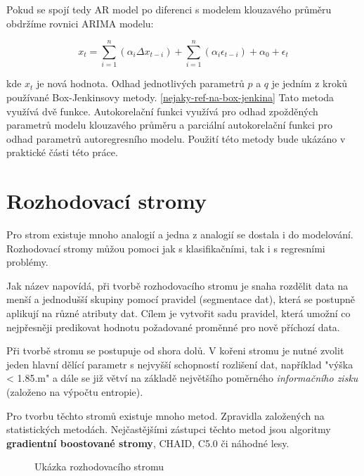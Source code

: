 \documentclass[FM,BP,fonts]{tulthesis}
\begin{document}
Pokud se spojí tedy AR model po diferenci s modelem klouzavého průměru obdržíme rovnici ARIMA modelu: 

\begin{equation}
 x_t =    \sum_{i=1}^{n}(\alpha_i \Delta x_{t-i}) + \sum_{i=1}^{n}(\alpha_i\epsilon_{t-i}) + \alpha_0 + \epsilon_t
\end{equation}

kde $x_t$ je nová hodnota. Odhad jednotlivých parametrů $p$ a $q$ je jedním z kroků používané Box-Jenkinsovy metody. \ref{nejaky-ref-na-box-jenkina} Tato metoda využívá dvě funkce. Autokorelační funkci využívá pro odhad zpožděných parametrů modelu klouzavého průměru a parciální autokorelační funkci pro odhad parametrů autoregresního modelu. Použití této metody bude ukázáno v praktické části této práce.


\section{Rozhodovací stromy}
Pro strom existuje mnoho analogií a jedna z analogií se dostala i do modelování. Rozhodovací stromy můžou pomoci jak s klasifikačními, tak i s regresními problémy. 

Jak název napovídá, při tvorbě rozhodovacího stromu je snaha rozdělit data na menší a jednodušší skupiny pomocí pravidel (segmentace dat), která se postupně aplikují na různé atributy dat. Cílem je vytvořit sadu pravidel, která umožní co nejpřesněji predikovat hodnotu požadované proměnné pro nově příchozí data.

Při tvorbě stromu se postupuje od shora dolů. V kořeni stromu je nutné zvolit jeden hlavní dělící parametr s nejvyšší schopností rozlišení dat, například "výška < 1.85.m" a dále se již větví na základě největšího poměrného \textit{informačního zisku} (založeno na výpočtu entropie).  \cite{Tomsik2016thesis}

Pro tvorbu těchto stromů existuje mnoho metod. Zpravidla založených na statistických metodách. Nejčastějšími zástupci těchto metod jsou algoritmy \textbf{gradientní boostované stromy}, CHAID, C5.0 či náhodné lesy. \cite{Tomsik2016thesis}

\begin{figure}[htbp]
	\centering
	\caption{Ukázka rozhodovacího stromu}
	\label{fig:my_graph}
\end{figure}
\end{document}
